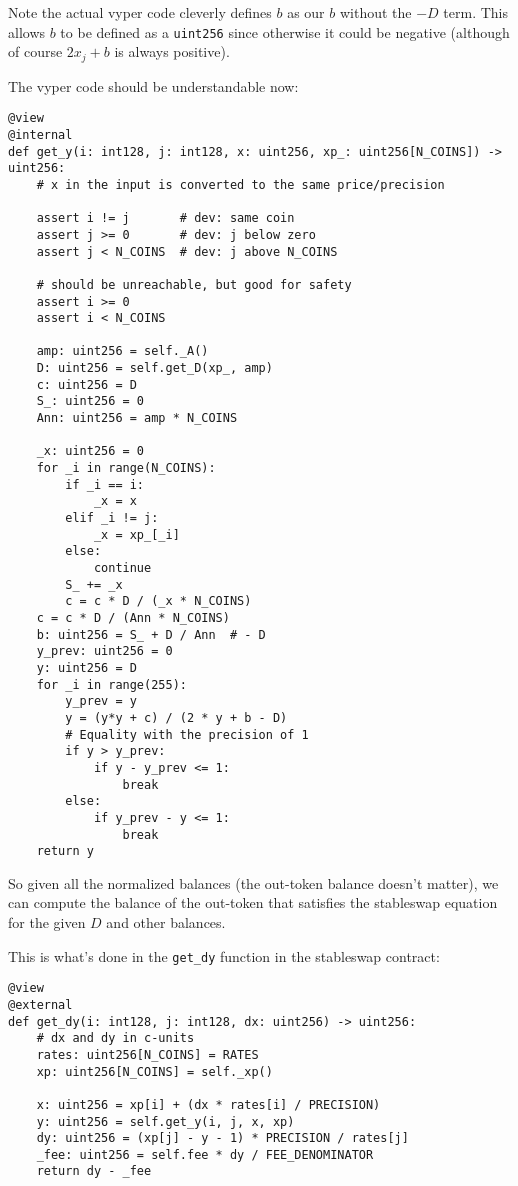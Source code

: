 \documentclass[
]{article}
\begin{document}
Note the actual vyper code cleverly defines \(b\) as our \(b\) without
the \(-D\) term. This allows \(b\) to be defined as a \texttt{uint256}
since otherwise it could be negative (although of course \(2x_j + b\) is
always positive).

The vyper code should be understandable now:

\begin{verbatim}
@view
@internal
def get_y(i: int128, j: int128, x: uint256, xp_: uint256[N_COINS]) -> uint256:
    # x in the input is converted to the same price/precision

    assert i != j       # dev: same coin
    assert j >= 0       # dev: j below zero
    assert j < N_COINS  # dev: j above N_COINS

    # should be unreachable, but good for safety
    assert i >= 0
    assert i < N_COINS

    amp: uint256 = self._A()
    D: uint256 = self.get_D(xp_, amp)
    c: uint256 = D
    S_: uint256 = 0
    Ann: uint256 = amp * N_COINS

    _x: uint256 = 0
    for _i in range(N_COINS):
        if _i == i:
            _x = x
        elif _i != j:
            _x = xp_[_i]
        else:
            continue
        S_ += _x
        c = c * D / (_x * N_COINS)
    c = c * D / (Ann * N_COINS)
    b: uint256 = S_ + D / Ann  # - D
    y_prev: uint256 = 0
    y: uint256 = D
    for _i in range(255):
        y_prev = y
        y = (y*y + c) / (2 * y + b - D)
        # Equality with the precision of 1
        if y > y_prev:
            if y - y_prev <= 1:
                break
        else:
            if y_prev - y <= 1:
                break
    return y
\end{verbatim}

So given all the normalized balances (the out-token balance doesn't
matter), we can compute the balance of the out-token that satisfies the
stableswap equation for the given \(D\) and other balances.

This is what's done in the \texttt{get\_dy} function in the stableswap
contract:

\begin{verbatim}
@view
@external
def get_dy(i: int128, j: int128, dx: uint256) -> uint256:
    # dx and dy in c-units
    rates: uint256[N_COINS] = RATES
    xp: uint256[N_COINS] = self._xp()

    x: uint256 = xp[i] + (dx * rates[i] / PRECISION)
    y: uint256 = self.get_y(i, j, x, xp)
    dy: uint256 = (xp[j] - y - 1) * PRECISION / rates[j]
    _fee: uint256 = self.fee * dy / FEE_DENOMINATOR
    return dy - _fee
\end{verbatim}
\end{document}
